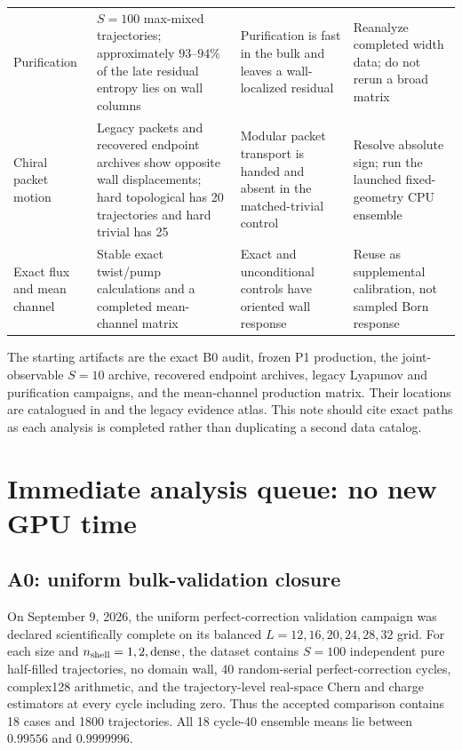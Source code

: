 \documentclass[aps,prx,twocolumn,floatfix,nofootinbib,superscriptaddress]{revtex4-2}
\begin{document}
\begin{table}[t]
\begin{tabularx}{\textwidth}{@{}p{}p{}Yp{0.22\textwidth}@{}}
Purification
& $S=100$ max-mixed trajectories; approximately $93$--$94\%$ of the late
residual entropy lies on wall columns
& Purification is fast in the bulk and leaves a wall-localized residual
& Reanalyze completed width data; do not rerun a broad matrix \\

Chiral packet motion
& Legacy packets and recovered endpoint archives show opposite wall
displacements; hard topological has 20 trajectories and hard trivial has 25
& Modular packet transport is handed and absent in the matched-trivial control
& Resolve absolute sign; run the launched fixed-geometry CPU ensemble \\

Exact flux and mean channel
& Stable exact twist/pump calculations and a completed mean-channel matrix
& Exact and unconditional controls have oriented wall response
& Reuse as supplemental calibration, not sampled Born response \\
\bottomrule
\end{tabularx}
\end{table}

The starting artifacts are the exact B0 audit, frozen P1 production, the
joint-observable $S=10$ archive, recovered endpoint archives, legacy Lyapunov
and purification campaigns, and the mean-channel production matrix.  Their
locations are catalogued in  and the
legacy evidence atlas.  This note should cite exact paths as each analysis is
completed rather than duplicating a second data catalog.

\section{Immediate analysis queue: no new GPU time}

\subsection{A0: uniform bulk-validation closure}

On September 9, 2026, the uniform perfect-correction validation campaign was
declared scientifically complete on its balanced $L=12,16,20,24,28,32$ grid.
For each size and $n_{\rm shell}=1,2,\mathrm{dense}$, the dataset contains
$S=100$ independent pure half-filled trajectories, no domain wall, 40
random-serial perfect-correction cycles, complex128 arithmetic, and the
trajectory-level real-space Chern and charge estimators at every cycle
including zero.  Thus the accepted comparison contains 18 cases and 1800
trajectories.  All 18 cycle-40 ensemble means lie between $0.99556$ and
$0.9999996$.
\end{document}

